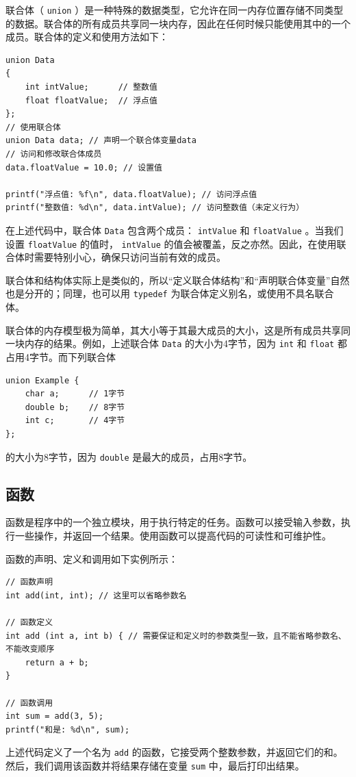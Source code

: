 联合体（ \texttt{union} ）是一种特殊的数据类型，它允许在同一内存位置存储不同类型的数据。联合体的所有成员共享同一块内存，因此在任何时候只能使用其中的一个成员。联合体的定义和使用方法如下：
\begin{verbatim}
union Data
{
    int intValue;      // 整数值
    float floatValue;  // 浮点值
};
// 使用联合体
union Data data; // 声明一个联合体变量data
// 访问和修改联合体成员
data.floatValue = 10.0; // 设置值

printf("浮点值: %f\n", data.floatValue); // 访问浮点值
printf("整数值: %d\n", data.intValue); // 访问整数值（未定义行为）
\end{verbatim}

在上述代码中，联合体 \texttt{Data} 包含两个成员： \texttt{intValue} 和 \texttt{floatValue} 。当我们设置 \texttt{floatValue} 的值时， \texttt{intValue} 的值会被覆盖，反之亦然。因此，在使用联合体时需要特别小心，确保只访问当前有效的成员。

联合体和结构体实际上是类似的，所以“定义联合体结构”和“声明联合体变量”自然也是分开的；同理，也可以用 \texttt{typedef} 为联合体定义别名，或使用不具名联合体。

联合体的内存模型极为简单，其大小等于其最大成员的大小，这是所有成员共享同一块内存的结果。例如，上述联合体 \texttt{Data} 的大小为4字节，因为 \texttt{int} 和 \texttt{float} 都占用4字节。而下列联合体
\begin{verbatim}
union Example {
    char a;      // 1字节
    double b;    // 8字节
    int c;       // 4字节
};
\end{verbatim}
的大小为8字节，因为 \texttt{double} 是最大的成员，占用8字节。

\subsection{函数}

函数是程序中的一个独立模块，用于执行特定的任务。函数可以接受输入参数，执行一些操作，并返回一个结果。使用函数可以提高代码的可读性和可维护性。

函数的声明、定义和调用如下实例所示：
\begin{verbatim}
// 函数声明
int add(int, int); // 这里可以省略参数名

// 函数定义
int add (int a, int b) { // 需要保证和定义时的参数类型一致，且不能省略参数名、不能改变顺序
    return a + b;
}

// 函数调用
int sum = add(3, 5);
printf("和是: %d\n", sum);
\end{verbatim}

上述代码定义了一个名为 \texttt{add} 的函数，它接受两个整数参数，并返回它们的和。然后，我们调用该函数并将结果存储在变量 \texttt{sum} 中，最后打印出结果。

